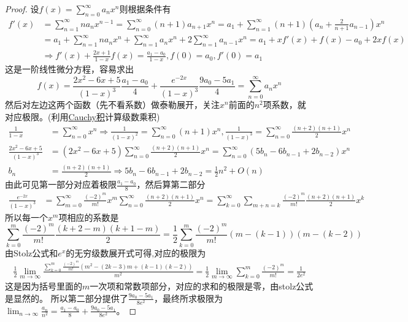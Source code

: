 \documentclass[../../main.tex]{subfiles}%
\begin{document}
\begin{proof}
设\(f(x)=\sum_{n = 0}^{\infty}a_nx^n\)则根据条件有
\begin{align*}
f'(x)&=\sum_{n = 1}^{\infty}na_nx^{n - 1}=\sum_{n = 0}^{\infty}(n + 1)a_{n + 1}x^n=a_1+\sum_{n = 1}^{\infty}(n + 1)\left(a_n+\frac{2}{n + 1}a_{n - 1}\right)x^n\\
&=a_1+\sum_{n = 1}^{\infty}na_nx^n+\sum_{n = 1}^{\infty}a_nx^n+2\sum_{n = 1}^{\infty}a_{n - 1}x^n=a_1+xf'(x)+f(x)-a_0+2xf(x)\\
&\Rightarrow f'(x)+\frac{2x + 1}{1 - x}f(x)=\frac{a_1 - a_0}{1 - x},f(0)=a_0,f'(0)=a_1
\end{align*}
这是一阶线性微分方程，容易求出
\[f(x)=\frac{2x^2 - 6x + 5}{(1 - x)^3}\frac{a_1 - a_0}{4}+\frac{e^{-2x}}{(1 - x)^3}\frac{9a_0 - 5a_1}{4}=\sum_{n = 0}^{\infty}a_nx^n\]
然后对左边这两个函数（先不看系数）做泰勒展开，关注\(x^n\)前面的\(n^2\)项系数，就对应极限。(利用\hyperref[corollary:收敛级数Cauchy积收敛则就等于级数积]{Cauchy积}计算级数乘积)
\begin{align*}
\frac{1}{1 - x}&=\sum_{n = 0}^{\infty}x^n\Rightarrow\frac{1}{(1 - x)^2}=\sum_{n = 0}^{\infty}(n + 1)x^n,\frac{1}{(1 - x)^3}=\sum_{n = 0}^{\infty}\frac{(n + 2)(n + 1)}{2}x^n\\
\frac{2x^2 - 6x + 5}{(1 - x)^3}&=(2x^2 - 6x + 5)\sum_{n = 0}^{\infty}\frac{(n + 2)(n + 1)}{2}x^n=\sum_{n = 0}^{\infty}(5b_n - 6b_{n - 1}+2b_{n - 2})x^n\\
b_n&=\frac{(n + 2)(n + 1)}{2}\Rightarrow 5b_n - 6b_{n - 1}+2b_{n - 2}=\frac{1}{2}n^2+O(n)
\end{align*}
由此可见第一部分对应着极限\(\frac{a_1 - a_0}{8}\)，然后算第二部分
\begin{align*}
\frac{e^{-2x}}{(1 - x)^3}&=\sum_{m = 0}^{\infty}\frac{(-2)^m}{m!}x^m\sum_{n = 0}^{\infty}\frac{(n + 2)(n + 1)}{2}x^n=\sum_{k = 0}^{\infty}\sum_{m + n = k}\frac{(-2)^m}{m!}\frac{(n + 2)(n + 1)}{2}x^k
\end{align*}
所以每一个\(x^m\)项相应的系数是
\[
\sum_{k = 0}^{m}\frac{(-2)^m}{m!}\frac{(k + 2 - m)(k + 1 - m)}{2}=\frac{1}{2}\sum_{k = 0}^{m}\frac{(-2)^m}{m!}(m - (k - 1))(m - (k - 2))
\]
由Stolz公式和$e^x$的无穷级数展开式可得,对应的极限为
\begin{align*}
\frac{1}{2}\lim_{m\rightarrow\infty}\frac{\sum\limits_{k = 0}^{m}\frac{(-2)^m}{m!}(m^2-(2k - 3)m+(k - 1)(k - 2))}{m^2}
=\frac{1}{2}\lim_{m\rightarrow\infty}\sum_{k = 0}^{m}\frac{(-2)^m}{m!}=\frac{1}{2e^2}
\end{align*}
这是因为括号里面的\(m\)一次项和常数项部分，对应的求和的极限是零，由stolz公式是显然的。
所以第二部分提供了\(\frac{9a_0 - 5a_1}{8e^2}\)，最终所求极限为\(\lim_{n\rightarrow\infty}\frac{a_n}{n^2}=\frac{a_1 - a_0}{8}+\frac{9a_0 - 5a_1}{8e^2}\)。

\end{proof}
\end{document}
